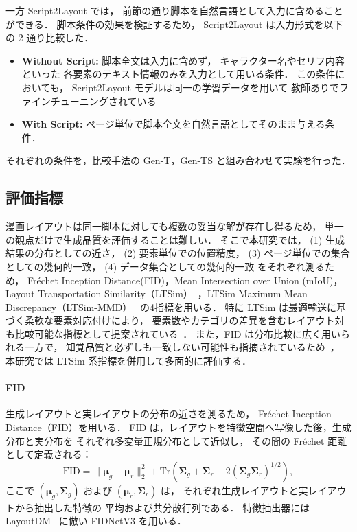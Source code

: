 \documentclass[a4j,12pt,dvipdfmx]{jsreport}
\begin{document}
一方 Script2Layout では，
前節の通り脚本を自然言語として入力に含めることができる．
脚本条件の効果を検証するため，
Script2Layout は入力形式を以下の 2 通り比較した．

\begin{itemize}
  \item \textbf{Without Script:}   脚本全文は入力に含めず，
        キャラクター名やセリフ内容といった
        各要素のテキスト情報のみを入力として用いる条件．
        この条件においても，
        Script2Layout モデルは同一の学習データを用いて
        教師ありでファインチューニングされている
  \item \textbf{With Script:} ページ単位で脚本全文を自然言語としてそのまま与える条件．
\end{itemize}

それぞれの条件を，比較手法の Gen-T，Gen-TS と組み合わせて実験を行った．

\subsection{評価指標}\label{sec:metrics}
漫画レイアウトは同一脚本に対しても複数の妥当な解が存在し得るため，
単一の観点だけで生成品質を評価することは難しい．
そこで本研究では，
(1) 生成結果の分布としての近さ，
(2) 要素単位での位置精度，
(3) ページ単位での集合としての幾何的一致，
(4) データ集合としての幾何的一致
をそれぞれ測るため，
Fréchet Inception Distance(FID)，Mean Intersection over Union (mIoU)，Layout Transportation Similarity（LTSim）~\cite{otani_ltsim_2024}，LTSim Maximum Mean Discrepancy（LTSim-MMD）~\cite{otani_ltsim_2024} の4指標を用いる．
特に LTSim は最適輸送に基づく柔軟な要素対応付けにより，
要素数やカテゴリの差異を含むレイアウト対も比較可能な指標として提案されている~\cite{otani_ltsim_2024}．
また，FID は分布比較に広く用いられる一方で，
知覚品質と必ずしも一致しない可能性も指摘されているため~\cite{otani_ltsim_2024}，
本研究では LTSim 系指標を併用して多面的に評価する．

\par
\paragraph{FID}
生成レイアウトと実レイアウトの分布の近さを測るため，
Fréchet Inception Distance（FID）を用いる．
FID は，レイアウトを特徴空間へ写像した後，生成分布と実分布を
それぞれ多変量正規分布として近似し，
その間の Fréchet 距離として定義される：
\begin{equation}
  \mathrm{FID}
  =
  \|\boldsymbol{\mu}_g - \boldsymbol{\mu}_r\|_2^2
  +
  \mathrm{Tr}
  \left(
  \boldsymbol{\Sigma}_g
  +
  \boldsymbol{\Sigma}_r
  -
  2(\boldsymbol{\Sigma}_g \boldsymbol{\Sigma}_r)^{1/2}
  \right),
\end{equation}
ここで $(\boldsymbol{\mu}_g, \boldsymbol{\Sigma}_g)$ および
$(\boldsymbol{\mu}_r, \boldsymbol{\Sigma}_r)$ は，
それぞれ生成レイアウトと実レイアウトから抽出した特徴の
平均および共分散行列である．
特徴抽出器には LayoutDM~\cite{inoue_layoutdm_2023} に倣い
FIDNetV3 を用いる．
\end{document}
